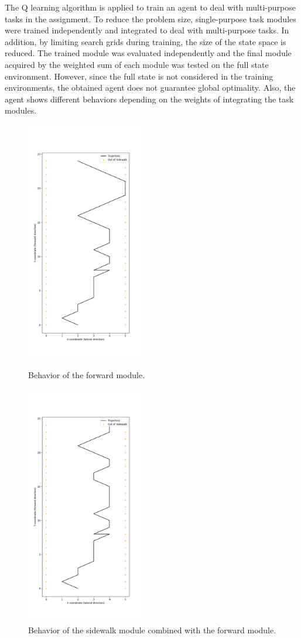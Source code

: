 \documentclass[conference]{IEEEtran}
\begin{document}
The Q learning algorithm is applied to train an agent to deal with multi-purpose tasks in the assignment. 
To reduce the problem size, single-purpose task modules were trained independently and integrated to deal with multi-purpose tasks.
In addition, by limiting search grids during training, the size of the state space is reduced.
The trained module was evaluated independently and the final module acquired by the weighted sum of each module was tested on the full state environment. 
However, since the full state is not considered in the training environments, the obtained agent does not guarantee global optimality.
Also, the agent shows different behaviors depending on the weights of integrating the task modules.

\begin{figure}[t]
	\centering
	\includegraphics[width=2in]{forward_eval.png}	
	\caption{Behavior of the forward module.}
	\label{fig:forward_eval}
	\includegraphics[width=2in]{sidewalk_eval.png}	
	\caption{Behavior of the sidewalk module combined with the forward module.}
	\label{fig:sidewalk_eval}
\end{figure}
\end{document}
